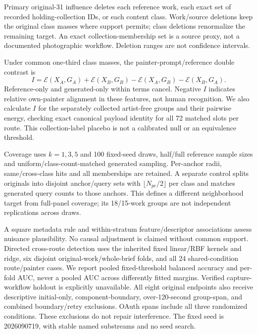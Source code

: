 Primary original-31 influence deletes each reference work, each exact set of
recorded holding-collection IDs, or each content class. Work/source deletions keep
the original class masses where support permits; class deletions renormalize the
remaining target. An exact collection-membership set is a source proxy, not a
documented photographic workflow. Deletion ranges are not confidence intervals.

Under common one-third class masses, the painter-prompt/reference double contrast is
\begin{equation}
 I=\mathcal E(X_A,G_A)+\mathcal E(X_B,G_B)
   -\mathcal E(X_A,G_B)-\mathcal E(X_B,G_A).\label{eq:specificity}
\end{equation}
Reference-only and generated-only within terms cancel. Negative $I$ indicates
relative own-painter alignment in these features, not human recognition. We also
calculate $I$ for the separately collected artist-free groups and their pairwise
energy, checking exact canonical payload identity for all 72 matched slots per
route. This collection-label placebo is not a calibrated null or an equivalence
threshold.

Coverage uses $k=1,3,5$ and 100 fixed-seed draws, half/full reference sample sizes
and uniform/class-count-matched generated sampling. Per-anchor radii,
same/cross-class hits and all memberships are retained. A separate control splits
originals into disjoint anchor/query sets with $\lfloor N_{pc}/2\rfloor$ per class
and matches generated query counts to those anchors. This defines a different
neighborhood target from full-panel coverage; its 18/15-work groups are not
independent replications across draws.

A square metadata rule and within-stratum feature/descriptor associations assess
nuisance plausibility. No causal adjustment is claimed without common support.
Directed cross-route detection uses the inherited fixed linear/RBF kernels and
ridge, six disjoint original-work/whole-brief folds, and all 24 shared-condition
route/painter cases. We report pooled fixed-threshold balanced accuracy and
per-fold AUC, never a pooled AUC across differently fitted margins. Verified
capture-workflow holdout is explicitly unavailable. All eight original endpoints
also receive descriptive initial-only, component-boundary, over-120-second
group-span, and combined boundary/retry exclusions. OAuth spans include all three
randomized conditions. These exclusions do not repair interference. The fixed
seed is 2026090719, with stable named substreams and no seed search.

